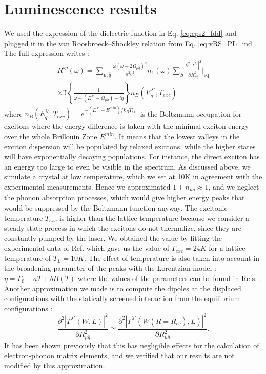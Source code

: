 \section{Luminescence results}
We used the expression of the dielectric function in Eq. \eqref{eq:eps2_fdd} and plugged it in the van Roosbroeck--Shockley relation from Eq. \eqref{eq:vRS_PL_ind}. The full expression writes :
\begin{multline}
	R^{sp}(\omega)= \sum_{\mu,{\bar{q}}} \frac{\omega(\omega + 2\Omega_{\mu \bar{q}})^2}{\pi^2 c^3 } n_1(\omega) \sum_S \frac{\partial^2 |T^{\lambda'}|^2 }{\partial R_{\mu\bar{q}}^2}\biggr|_{\text{eq}} \\ \times	\Im \left\{\frac{1}{\omega-(E^{\lambda'}-\Omega_{\mu \bar{q}})+i\eta}\right\} n_B(E^{\lambda'}_{\bar{q}},T_{exc})
\end{multline}
where $n_B(E^{\lambda'}_{\bar{q}},T_{exc}) = e^{-(E^{\lambda'}-E^{min})/k_BT_{exc}}$ is the Boltzmann occupation for excitons where the energy difference is taken with the minimal exciton energy over the whole Brillouin Zone $E^{min}$. It means that the lowest valleys in the exciton dispersion will be populated by relaxed excitons, while the higher states will have exponentially decaying populations. For instance, the direct exciton has an energy too large to even be visible in the spectrum.
As discussed above, we simulate a crystal at low temperature, which we set at 10K in agreement with the experimental measurements. Hence we approximated $1 + n_{\mu\bar{q}} \approx 1$, and we neglect the phonon absorption processes, which would give higher energy peaks that would be suppressed by the Boltzmann function anyway. The excitonic temperature $T_{exc}$ is higher than the lattice temperature because we consider a steady-state process in which the excitons do not thermalize, since they are constantly pumped by the laser. We obtained the value by fitting the experimental data of Ref. \cite{cassabois2016hexagonal} which gave us the value of $T_{exc} = 24 K$ for a lattice temperature of $T_L = 10 K$. The effect of temperature is also taken into account in the broadening parameter of the peaks with the Lorentzian model : $\eta = \Gamma_0 + aT + bB(T)$ where the values of the parameters can be found in Refs. \cite{paleari2019exciton,vuong2017exciton}. Another approximation we made is to compute the dipoles at the displaced configurations with the statically screened interaction from the equilibrium configurations : 
\begin{equation}
	\frac{\partial^2 |T^{\lambda'} (W, L )|^2 }{\partial R_{\mu \bar{q}}^2} \simeq \frac{\partial^2 |T^{\lambda'} (W(R=R_{eq}), L) |^2 }{\partial R_{\mu \bar{q}}^2}.
\end{equation}
It has been shown previously that this has negligible effects for the calculation of electron-phonon matrix elements,\cite{faber2015exploring} and we verified that our results are not modified by this approximation. 

